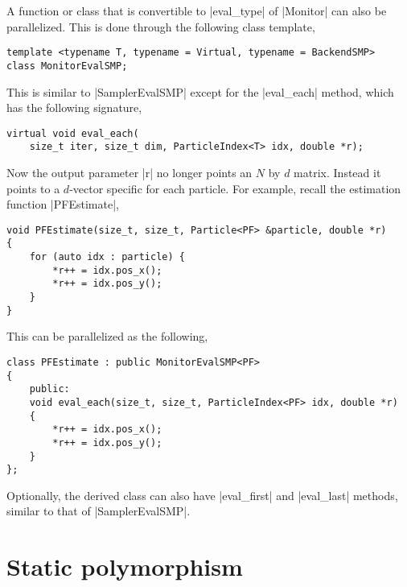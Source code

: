A function or class that is convertible to |eval_type| of |Monitor| can also be
parallelized. This is done through the following class template,
\begin{verbatim}
template <typename T, typename = Virtual, typename = BackendSMP>
class MonitorEvalSMP;
\end{verbatim}
This is similar to |SamplerEvalSMP| except for the |eval_each| method, which
has the following signature,
\begin{verbatim}
virtual void eval_each(
    size_t iter, size_t dim, ParticleIndex<T> idx, double *r);
\end{verbatim}
Now the output parameter |r| no longer points an $N$ by $d$ matrix. Instead it
points to a $d$-vector specific for each particle. For example, recall the
estimation function |PFEstimate|,
\begin{verbatim}
void PFEstimate(size_t, size_t, Particle<PF> &particle, double *r)
{
    for (auto idx : particle) {
        *r++ = idx.pos_x();
        *r++ = idx.pos_y();
    }
}
\end{verbatim}
This can be parallelized as the following,
\begin{verbatim}
class PFEstimate : public MonitorEvalSMP<PF>
{
    public:
    void eval_each(size_t, size_t, ParticleIndex<PF> idx, double *r)
    {
        *r++ = idx.pos_x();
        *r++ = idx.pos_y();
    }
};
\end{verbatim}
Optionally, the derived class can also have |eval_first| and |eval_last|
methods, similar to that of |SamplerEvalSMP|.

\section{Static polymorphism}
\label{sec:Static polymorphism}

